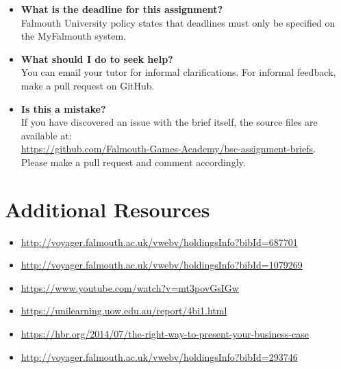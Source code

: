 \documentclass{../fal_assignment}
\begin{document}
\begin{itemize}
	\item 	\textbf{What is the deadline for this assignment?} \\ 
    		Falmouth University policy states that deadlines must only be specified on the MyFalmouth system.
    		
	\item 	\textbf{What should I do to seek help?} \\ 
    		You can email your tutor for informal clarifications. For informal feedback, make a pull request on GitHub. 
    		
    	\item 	\textbf{Is this a mistake?} \\ 	
    		If you have discovered an issue with the brief itself, the source files are available at: \\
    		\url{https://github.com/Falmouth-Games-Academy/bsc-assignment-briefs}.\\
    		 Please make a pull request and comment accordingly.
\end{itemize}

\section*{Additional Resources}

\begin{itemize}
    \item \url{http://voyager.falmouth.ac.uk/vwebv/holdingsInfo?bibId=687701}
    \item \url{http://voyager.falmouth.ac.uk/vwebv/holdingsInfo?bibId=1079269}
    \item \url{https://www.youtube.com/watch?v=mt3povGsIGw}
    \item \url{https://unilearning.uow.edu.au/report/4bi1.html}
    \item \url{https://hbr.org/2014/07/the-right-way-to-present-your-business-case}
    \item \url{http://voyager.falmouth.ac.uk/vwebv/holdingsInfo?bibId=293746}
\end{itemize}

\rubricyeartwo
\end{document}
